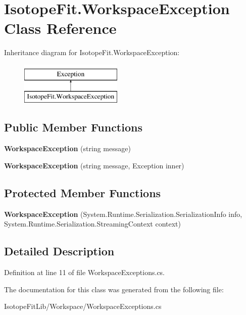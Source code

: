 \hypertarget{class_isotope_fit_1_1_workspace_exception}{}\section{Isotope\+Fit.\+Workspace\+Exception Class Reference}
\label{class_isotope_fit_1_1_workspace_exception}
Inheritance diagram for Isotope\+Fit.\+Workspace\+Exception\+:\begin{figure}[H]
\begin{center}
\leavevmode
\includegraphics[height=2.000000cm]{class_isotope_fit_1_1_workspace_exception}
\end{center}
\end{figure}
\subsection*{Public Member Functions}
\begin{DoxyCompactItemize}
\item 
\mbox{\label{class_isotope_fit_1_1_workspace_exception_ab2e696f3ca002f368d9096859fe0334d}} 
{\bfseries Workspace\+Exception} (string message)
\item 
\mbox{\label{class_isotope_fit_1_1_workspace_exception_abbe9ee85b419e62e43c0085576636b9b}} 
{\bfseries Workspace\+Exception} (string message, Exception inner)
\end{DoxyCompactItemize}
\subsection*{Protected Member Functions}
\begin{DoxyCompactItemize}
\item 
\mbox{\label{class_isotope_fit_1_1_workspace_exception_aef82f0b4fafaa7fcb565c2cbe6c890ca}} 
{\bfseries Workspace\+Exception} (System.\+Runtime.\+Serialization.\+Serialization\+Info info, System.\+Runtime.\+Serialization.\+Streaming\+Context context)
\end{DoxyCompactItemize}


\subsection{Detailed Description}


Definition at line 11 of file Workspace\+Exceptions.\+cs.



The documentation for this class was generated from the following file\+:\begin{DoxyCompactItemize}
\item 
Isotope\+Fit\+Lib/\+Workspace/Workspace\+Exceptions.\+cs\end{DoxyCompactItemize}
